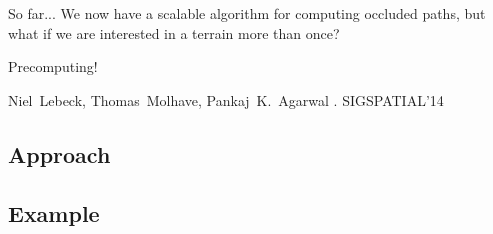 \begin{frame}{So far...}
	\centering\Large
	We now have a scalable algorithm for computing occluded paths, but what if we are interested in a terrain more than once?
	\pause

	Precomputing!
	\pause

	\begin{thebibliography}{10}
		\beamertemplatearticlebibitems
			Niel~Lebeck, Thomas~M\-olhave, Pankaj~K.~Agarwal
		.
		\newblock SIGSPATIAL'14
	\end{thebibliography}

\end{frame}

\subsection{Approach}


\subsection{Example}



